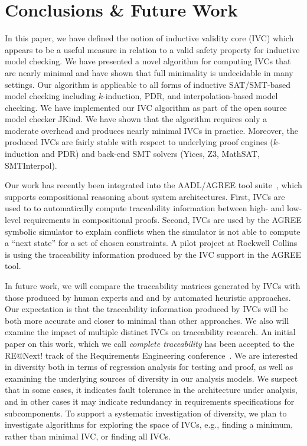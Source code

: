 \section{Conclusions \& Future Work}
\label{sec:conc}

In this paper, we have defined the notion of inductive validity core (IVC) which
appears to be a useful measure in relation to a valid safety property
for inductive model checking. We have presented a novel algorithm for
computing IVCs that are nearly minimal and have shown that full
minimality is undecidable in many settings. Our algorithm is
applicable to all forms of inductive SAT/SMT-based model checking
including $k$-induction, PDR, and
interpolation-based model checking.
%
We have implemented our IVC algorithm as part of the open source model
checker JKind. We have shown that the algorithm requires only a
moderate overhead and produces nearly minimal IVCs in practice.
Moreover, the produced IVCs are fairly stable with respect to
underlying proof engines ($k$-induction and PDR) and back-end SMT
solvers (Yices, Z3, MathSAT, SMTInterpol).

Our work has recently been integrated into the AADL/AGREE tool
suite~\cite{QFCS15:backes,hilt2013}, which supports compositional
reasoning about system architectures.  First, IVCs are used to
to automatically compute traceability information between high- and
low-level requirements in compositional proofs. Second, IVCs are
used by the AGREE symbolic simulator to explain conflicts when the
simulator is not able to compute a ``next state'' for a set of chosen
constraints.  A pilot project at Rockwell
Collins is using the traceability information produced by the IVC
support in the AGREE tool.

In future work, we will compare the traceability matrices
generated by IVCs with those produced by human experts and and by
automated heuristic approaches.  Our expectation is that the traceability
information produced by IVCs will be both more accurate and closer to
minimal than other approaches.
We also will examine the impact of multiple distinct IVCs on traceability
research.  An initial paper on this work, which we call {\em complete traceability}
has been accepted to the RE@Next! track of the Requirements Engineering
conference~\cite{Murugesan16:renext}.  We are interested in diversity both
in terms of regression analysis for testing and proof, as well as examining
the underlying sources of diversity in our analysis models.  We suspect that
in some cases, it indicates fault tolerance in the architecture under analysis,
and in other cases it may indicate redundancy in requirements specifications
for subcomponents.  To support a systematic investigation of diversity, we
plan to investigate algorithms for exploring the space of IVCs, e.g., finding
a minimum, rather than minimal IVC, or finding all IVCs.

